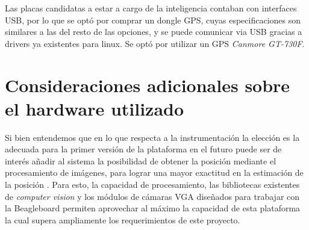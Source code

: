 \documentclass[main]{subfiles}
\begin{document}
Las placas candidatas a estar a cargo de la inteligencia contaban con interfaces USB, por lo que se opt\'o por comprar un dongle GPS, cuyas especificaciones son similares a las del resto de las opciones, y se puede comunicar via USB gracias a drivers ya existentes para linux. Se opt\'o por utilizar un GPS \textit{Canmore GT-730F}.

\section{Consideraciones adicionales sobre el hardware utilizado}

Si bien entendemos que en lo que respecta a la instrumentaci\'on la elecci\'on es la adecuada para la primer versi\'on de la plataforma en el futuro puede ser de inter\'es añadir al sistema la posibilidad de obtener la posici\'on mediante el procesamiento de im\'agenes, para lograr una mayor exactitud en la estimaci\'on de la posici\'on . Para esto, la capacidad de procesamiento, las bibliotecas existentes de \emph{computer vision} y los m\'odulos de c\'amaras VGA dise\~nados para trabajar con la Beagleboard permiten aprovechar al m\'aximo la capacidad de esta plataforma la cual supera ampliamente los requerimientos de este proyecto.\\

 
\end{document}
